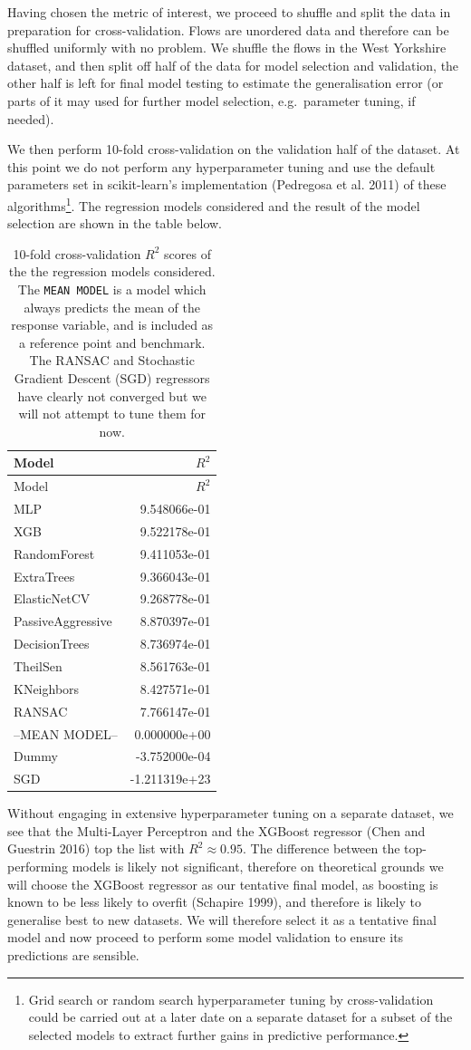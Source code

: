 \documentclass[11pt]{article}
\let\rmarkdownfootnote\footnote%
\def\footnote{\protect\rmarkdownfootnote}
\begin{document}
Having chosen the metric of interest, we proceed to shuffle and split
the data in preparation for cross-validation. Flows are unordered data
and therefore can be shuffled uniformly with no problem. We shuffle the
flows in the West Yorkshire dataset, and then split off half of the data
for model selection and validation, the other half is left for final
model testing to estimate the generalisation error (or parts of it may
used for further model selection, e.g.~parameter tuning, if needed).

We then perform 10-fold cross-validation on the validation half of the
dataset. At this point we do not perform any hyperparameter tuning and
use the default parameters set in scikit-learn's implementation
(Pedregosa et al. 2011) of these algorithms\footnote{Grid search or
  random search hyperparameter tuning by cross-validation could be
  carried out at a later date on a separate dataset for a subset of the
  selected models to extract further gains in predictive performance.}.
The regression models considered and the result of the model selection
are shown in the table below.

\begin{longtable}[]{@{}lr@{}}
\caption{10-fold cross-validation \(R^2\) scores of the the regression
models considered. The \texttt{MEAN\ MODEL} is a model which always
predicts the mean of the response variable, and is included as a
reference point and benchmark. The RANSAC and Stochastic Gradient
Descent (SGD) regressors have clearly not converged but we will not
attempt to tune them for now.}\tabularnewline
\toprule
Model & \(R^2\)\tabularnewline
\midrule
\endfirsthead
\toprule
Model & \(R^2\)\tabularnewline
\midrule
\endhead
MLP & 9.548066e-01\tabularnewline
XGB & 9.522178e-01\tabularnewline
RandomForest & 9.411053e-01\tabularnewline
ExtraTrees & 9.366043e-01\tabularnewline
ElasticNetCV & 9.268778e-01\tabularnewline
PassiveAggressive & 8.870397e-01\tabularnewline
DecisionTrees & 8.736974e-01\tabularnewline
TheilSen & 8.561763e-01\tabularnewline
KNeighbors & 8.427571e-01\tabularnewline
RANSAC & 7.766147e-01\tabularnewline
--MEAN MODEL-- & 0.000000e+00\tabularnewline
Dummy & -3.752000e-04\tabularnewline
SGD & -1.211319e+23\tabularnewline
\bottomrule
\end{longtable}

Without engaging in extensive hyperparameter tuning on a separate
dataset, we see that the Multi-Layer Perceptron and the XGBoost
regressor (Chen and Guestrin 2016) top the list with
\(R^2 \approx 0.95\). The difference between the top-performing models
is likely not significant, therefore on theoretical grounds we will
choose the XGBoost regressor as our tentative final model, as boosting
is known to be less likely to overfit (Schapire 1999), and therefore is
likely to generalise best to new datasets. We will therefore select it
as a tentative final model and now proceed to perform some model
validation to ensure its predictions are sensible.
\end{document}
